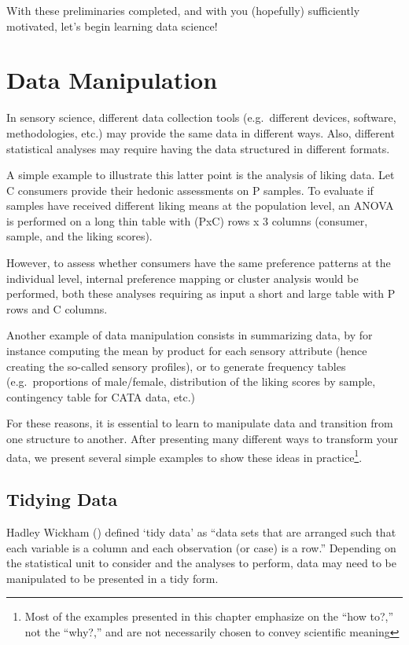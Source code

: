 \documentclass[
]{book}
\begin{document}
With these preliminaries completed, and with you (hopefully) sufficiently motivated, let's begin learning data science!

\hypertarget{data-manip}{%
\chapter{Data Manipulation}\label{data-manip}}

In sensory science, different data collection tools (e.g.~different devices, software, methodologies, etc.) may provide the same data in different ways. Also, different statistical analyses may require having the data structured in different formats.

A simple example to illustrate this latter point is the analysis of liking data.
Let C consumers provide their hedonic assessments on P samples. To evaluate if samples have received different liking means at the population level, an ANOVA is performed on a long thin table with (PxC) rows x 3 columns (consumer, sample, and the liking scores).

However, to assess whether consumers have the same preference patterns at the individual level, internal preference mapping or cluster analysis would be performed, both these analyses requiring as input a short and large table with P rows and C columns.

Another example of data manipulation consists in summarizing data, by for instance computing the mean by product for each sensory attribute (hence creating the so-called sensory profiles), or to generate frequency tables (e.g.~proportions of male/female, distribution of the liking scores by sample, contingency table for CATA data, etc.)

For these reasons, it is essential to learn to manipulate data and transition from one structure to another. After presenting many different ways to transform your data, we present several simple examples to show these ideas in practice\footnote{Most of the examples presented in this chapter emphasize on the ``how to?,'' not the ``why?,'' and are not necessarily chosen to convey scientific meaning}.

\hypertarget{tidy-data}{%
\section{Tidying Data}\label{tidy-data}}

Hadley Wickham (\citet{Wickham2014}) defined `tidy data' as ``data sets that are arranged such that each variable is a column and each observation (or case) is a row.'' Depending on the statistical unit to consider and the analyses to perform, data may need to be manipulated to be presented in a tidy form.
\end{document}

